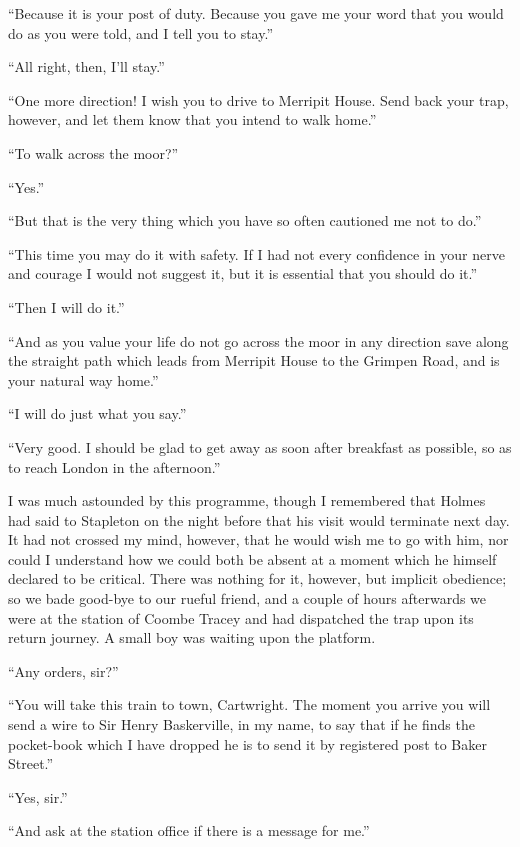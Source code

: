 \documentclass[paper=5.5in:8.5in,BCOR=7mm,twoside,DIV=calc,12pt,usegeometry,openany,chapterprefix,endperiod,headings=big]{scrbook} %
\begin{document}
\enquote{Because it is your post of duty. Because you gave me your word that you would do as you were told, and I tell you to stay.}

\enquote{All right, then, I'll stay.}

\enquote{One more direction! I wish you to drive to Merripit House. Send back your trap, however, and let them know that you intend to walk home.}

\enquote{To walk across the moor?}

\enquote{Yes.}

\enquote{But that is the very thing which you have so often cautioned me not to do.}

\enquote{This time you may do it with safety. If I had not every confidence in your nerve and courage I would not suggest it, but it is essential that you should do it.}

\enquote{Then I will do it.}

\enquote{And as you value your life do not go across the moor in any direction save along the straight path which leads from Merripit House to the Grimpen Road, and is your natural way home.}

\enquote{I will do just what you say.}

\enquote{Very good. I should be glad to get away as soon after breakfast as possible, so as to reach London in the afternoon.}

I was much astounded by this programme, though I re\-mem\-bered that Holmes had said to Stapleton on the night before that his visit would terminate next day. It had not crossed my mind, however, that he would wish me to go with him, nor could I understand how we could both be absent at a moment which he himself declared to be critical. There was nothing for it, however, but implicit obedience; so we bade good-bye to our rueful friend, and a couple of hours afterwards we were at the station of Coombe Tracey and had dispatched the trap upon its return journey. A small boy was waiting upon the platform.

\enquote{Any orders, sir?}

\enquote{You will take this train to town, Cartwright. The moment you arrive you will send a wire to Sir Henry Baskerville, in my name, to say that if he finds the pocket-book which I have dropped he is to send it by registered post to Baker Street.}

\enquote{Yes, sir.}

\enquote{And ask at the station office if there is a message for me.}
\end{document}
